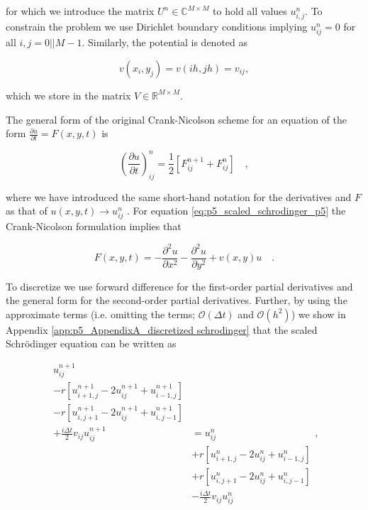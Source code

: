 \documentclass[../main_proj5.tex]{subfiles}
\begin{document}
\noindent for which we introduce the matrix $U^{n}\in\mathbb{C}^{M\times M}$ to hold all values $u_{i,j}^{n}$. To constrain the problem we use Dirichlet boundary conditions implying $u_{ij}^{n} = 0$ for all $i,j =0 || M-1$. Similarly, the potential is denoted as 

\begin{equation}
    v(x_i, y_j) = v(ih,jh) = v_{ij} ,
\end{equation}

\noindent which we store in the matrix $V\in\mathbb{R}^{M\times M}$. 

The general form of the original Crank-Nicolson scheme for an equation of the form $\frac{\partial u}{\partial t} = F(x, y, t)$ is 

\begin{equation}
    \label{eq:p5_general_Crank_Nicolson}
    \left(\frac{\partial u}{\partial t} \right)_{ij}^n = 
    \frac{1}{2}\left[F_{ij}^{n+1} + F_{ij}^{n}\right] \quad, 
\end{equation}

\noindent where we have introduced the same short-hand notation for the derivatives and $F$ as that of $u(x,y,t) \to u_{ij}^n$ \cite{lecture_notes}. For equation \eqref{eq:p5_scaled_schrodinger_p5} the Crank-Nicolson formulation implies that 

\begin{equation}
    F(x,y,t) = -\frac{\partial^{2}u}{\partial x^{2}} - \frac{\partial^{2} u}{\partial y^{2}} + v(x,y ) u \quad.
\end{equation}

To discretize we use forward difference for the first-order partial derivatives and the general form for the second-order partial derivatives. Further, by using the approximate terms (i.e. omitting the terms; $\mathcal{O}(\Delta t)$ and $\mathcal{O}(h^{2})$) we show in Appendix \ref{app:p5_AppendixA_discretized schrodinger} that the scaled Schr\"odinger equation can be written as 

\begin{equation}
\label{eq:p5_discretized_schrodinger_crank_nicolson}
\begin{split}
    u_{ij}^{n+1} &  \\
    - r \left[u_{i+1,j}^{n+1} - 2u_{ij}^{n+1} + u_{i-1,j}^{n+1}\right] & \\
    - r \left[u_{i,j+1}^{n+1} - 2u_{ij}^{n+1} + u_{i,j-1}^{n+1}\right]&  \\
    + \frac{i \Delta t}{2} v_{ij} u_{ij}^{n+1} &=   u_{ij}^n \\
    & +r \left[u_{i+1,j}^n - 2u_{ij}^n + u_{i-1,j}^n\right]  \\
    & +  r \left[u_{i,j+1}^n - 2u_{ij}^n + u_{i,j-1}^n\right]  \\
    &  -  \frac{i \Delta t}{2} v_{ij} u_{ij}^n 
\end{split}, 
\end{equation}
\end{document}
